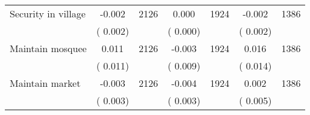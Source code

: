 \begin{tabular}{l*{6}{c}}
Security in village        &             -0.002      &       2126       &              0.000      &       1924       &             -0.002      &       1386       \\
                       &       (       0.002)            &                               &       (       0.000)            &                               &       (       0.002)            &                               \\
Maintain mosquee        &              0.011      &       2126       &             -0.003      &       1924       &              0.016      &       1386       \\
                       &       (       0.011)            &                               &       (       0.009)            &                               &       (       0.014)            &                               \\
Maintain market        &             -0.003      &       2126       &             -0.004      &       1924       &              0.002      &       1386       \\
                       &       (       0.003)            &                               &       (       0.003)            &                               &       (       0.005)            &                               \\
\hline \end{tabular}